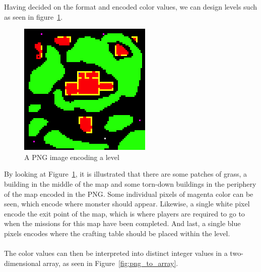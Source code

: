 Having decided on the format and encoded color values, we can design levels such as seen in figure~\ref{fig:png_map}.

\begin{figure}[H]
    \centering
    \includegraphics{figures/generating_levels/map.png}
    \caption{A PNG image encoding a level}
    \label{fig:png_map}
\end{figure}
By looking at Figure~\ref{fig:png_map}, it is illustrated that there are some patches of grass, a building in the middle of the map and some torn-down buildings in the periphery of the map encoded in the PNG.
Some individual pixels of magenta color can be seen, which encode where monster should appear. 
Likewise, a single white pixel encode the exit point of the map, which is where players are required to go to when the missions for this map have been completed. 
And last, a single blue pixels encodes where the crafting table should be placed within the level.
\\\\
The color values can then be interpreted into distinct integer values in a two-dimensional array, as seen in Figure~\ref{fig:png_to_array}.
